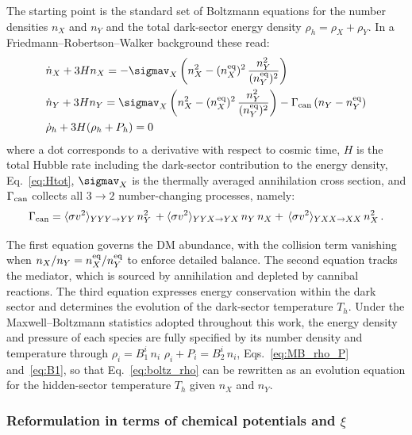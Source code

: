 The starting point is the standard set of Boltzmann equations for the
number densities $n_X$ and $n_Y$ and the total dark-sector energy
density $\rho_h = \rho_X + \rho_Y$.  In a Friedmann--Robertson--Walker background these read:
\begin{align}
    &\dot{n}_X + 3H n_X = -\sigmav_{X}\left(n_X^2 - (n_X^{\text{eq}})^2\,\frac{n_Y^2}{(n_Y^{\text{eq}})^2}\right) \label{eq:boltz_nX} \\
    &\dot{n}_Y + 3H n_Y = \sigmav_{X}\left(n_X^2 - (n_X^{\text{eq}})^2\,\frac{n_Y^2}{(n_Y^{\text{eq}})^2}\right) - \Gamma_{\rm can}\,(n_Y - n_Y^{\text{eq}}) \label{eq:boltz_nY} \\
    &\dot{\rho}_h + 3H(\rho_h + P_h) = 0 \label{eq:boltz_rho}
\end{align}
where a dot corresponds to a derivative with respect to cosmic time, $H$ is the total Hubble rate including the dark-sector contribution to the energy density, Eq.~\eqref{eq:Htot}, $\sigmav_{X}$ is the thermally averaged annihilation cross section, and $\Gamma_{\rm can}$ collects all $3\to2$ number-changing processes, namely:
\begin{equation}
  \Gamma_{\rm can} = \langle\sigma v^2\rangle_{YYY\to YY}\,n_Y^2\,+\langle\sigma v^2\rangle_{YYX\to YX}\,n_Y\,n_X+\,
\langle\sigma v^2\rangle_{YXX\to XX}\,n_X^2\,.
\label{eq:Gamma_can_std}
\end{equation}


The first equation governs the DM abundance, with the collision term vanishing when $n_X/n_Y = n_X^{\rm eq}/n_Y^{\rm eq}$ to enforce detailed balance. The second equation tracks the mediator, which is sourced by annihilation and depleted by cannibal reactions. The third equation expresses energy conservation within the dark sector and determines the evolution of the dark-sector temperature $T_h$. Under the Maxwell--Boltzmann statistics  adopted throughout this work, the energy density and pressure of each species are fully specified by its number density and temperature through $\rho_i = B_1^i\,n_i$ $\rho_i + P_i =B_2^i\, n_i$, Eqs.~\eqref{eq:MB_rho_P} and~\eqref{eq:B1}, so that Eq.~\eqref{eq:boltz_rho} can be rewritten as an evolution equation for the hidden-sector temperature $T_h$ given $n_X$ and $n_Y$.

\subsubsection{Reformulation in terms of chemical potentials and $\xi$}
\label{sec:chempot_formulation}

